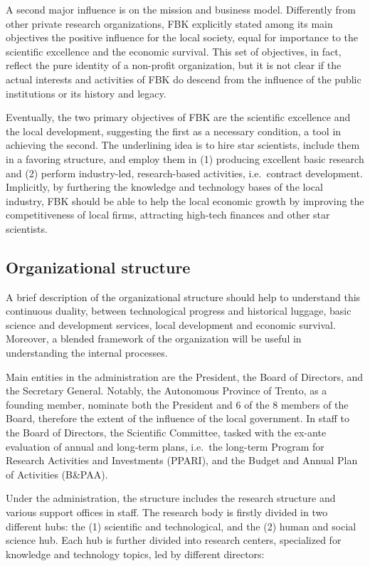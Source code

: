 A second major influence is on the mission and business model. Differently from other private research organizations, FBK explicitly stated among its main objectives the positive influence for the local society, equal for importance to the scientific excellence and the economic survival. This set of objectives, in fact, reflect the pure identity of a non-profit organization, but it is not clear if the actual interests and activities of FBK do descend from the influence of the public institutions or its history and legacy.

Eventually, the two primary objectives of FBK are the scientific excellence and the local development, suggesting the first as a necessary condition, a tool in achieving the second. The underlining idea is to hire star scientists, include them in a favoring structure, and employ them in (1) producing excellent basic research and (2) perform industry-led, research-based activities, i.e.\ contract development. Implicitly, by furthering the knowledge and technology bases of the local industry, FBK should be able to help the local economic growth by improving the competitiveness of local firms, attracting high-tech finances and other star scientists.

\subsection{Organizational structure}

A brief description of the organizational structure should help to understand this continuous duality, between technological progress and historical luggage, basic science and development services, local development and economic survival. Moreover, a blended framework of the organization will be useful in understanding the internal processes. 

Main entities in the administration are the President, the Board of Directors, and the Secretary General. Notably, the Autonomous Province of Trento, as a founding member, nominate both the President and 6 of the 8 members of the Board, therefore the extent of the influence of the local government. In staff to the Board of Directors, the Scientific Committee, tasked with the ex-ante evaluation of annual and long-term plans, i.e.\ the long-term Program for Research Activities and Investments (PPARI), and the Budget and Annual Plan of Activities (B\&PAA).

Under the administration, the structure includes the research structure and various support offices in staff. The research body is firstly divided in two different hubs: the (1) scientific and technological, and the (2) human and social science hub. Each hub is further divided into research centers, specialized for knowledge and technology topics, led by different directors:

